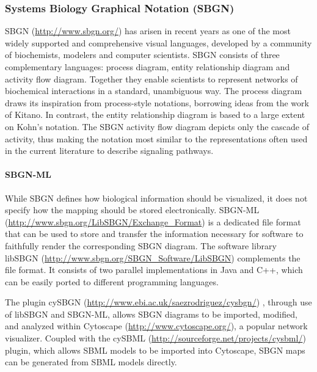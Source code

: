 \subsubsection{Systems Biology Graphical Notation (SBGN)}

SBGN (\url{http://www.sbgn.org/}) \autocite{le2009systems} has arisen in
recent years as one of the most widely supported and comprehensive
visual languages, developed by a community of biochemists, modelers and
computer scientists. SBGN consists of three complementary languages:
process diagram, entity relationship diagram and activity flow diagram.
Together they enable scientists to represent networks of biochemical
interactions in a standard, unambiguous way. The process diagram draws
its inspiration from process-style notations, borrowing ideas from the
work of Kitano. In contrast, the entity relationship diagram is based to
a large extent on Kohn's notation. The SBGN activity flow diagram
depicts only the cascade of activity, thus making the notation most
similar to the representations often used in the current literature to
describe signaling pathways.

\paragraph{SBGN-ML}

While SBGN defines how biological information should be visualized, it
does not specify how the mapping should be stored electronically.
SBGN-ML (\url{http://www.sbgn.org/LibSBGN/Exchange_Format})
\autocite{le2010report} is a dedicated file format that can be used to
store and transfer the information necessary for software to faithfully
render the corresponding SBGN diagram. The software library libSBGN
(\url{http://www.sbgn.org/SBGN_Software/LibSBGN}) complements the file
format. It consists of two parallel implementations
\autocite{van2012software} in Java and C++, which can be easily ported
to different programming languages.

The plugin cySBGN (\url{http://www.ebi.ac.uk/saezrodriguez/cysbgn/})
\autocite{goncalves2013cysbgn}, through use of libSBGN and SBGN-ML,
allows SBGN diagrams to be imported, modified, and analyzed within
Cytoscape (\url{http://www.cytoscape.org/}), a popular network
visualizer. Coupled with the cySBML
(\url{http://sourceforge.net/projects/cysbml/})
\autocite{konig2012cysbml} plugin, which allows SBML models to be
imported into Cytoscape, SBGN maps can be generated from SBML models
directly.

